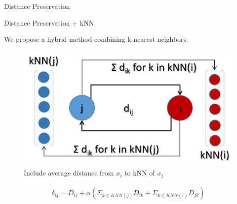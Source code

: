 \documentclass[final]{beamer}
\newlength{\onecolwid}
\begin{document}
\begin{frame}[t]
\begin{columns}[t]
\begin{column}{\onecolwid}
\begin{block}{Distance Preservation}
\begin{enumerate}
\end{enumerate}
\end{block}

\begin{block}{Distance Preservation + kNN}

We propose a hybrid method combining k-nearest neighbors.

\begin{figure}[!ht]
\includegraphics[width=0.4\linewidth]{images/kNN_dist.PNG}
\caption{Include average distance from $x_i$ to kNN of $x_j$}
\end{figure}

\begin{align*}
\delta_{ij} = D_{ij} + \alpha (\Sigma_{k \in KNN(j)} D_{ik} + \Sigma_{k \in KNN(i)} D_{jk}) 
\end{align*}
\vspace{10mm}


\end{block}
\end{column}
\end{columns}
\end{frame}
\end{document}
